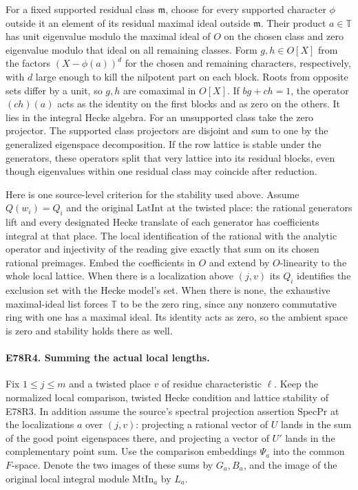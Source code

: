 For a fixed supported residual class $\mathfrak m$, choose for every
supported character $\phi$ outside it an element of its residual
maximal ideal outside $\mathfrak m$. Their product $a\in\mathbb T$
has unit eigenvalue modulo the maximal ideal of $O$ on the chosen
class and zero eigenvalue modulo that ideal on all remaining classes.
Form $g,h\in O[X]$ from the factors $(X-\phi(a))^d$ for the
chosen and remaining characters, respectively, with $d$ large enough
to kill the nilpotent part on each block. Roots from opposite sets
differ by a unit, so $g,h$ are comaximal in $O[X]$. If
$bg+ch=1$, the operator $(ch)(a)$ acts as the identity on the
first blocks and as zero on the others. It lies in the integral
Hecke algebra. For an unsupported class take the zero projector.
The supported class projectors are disjoint and sum to one by the
generalized eigenspace decomposition. If the row lattice is stable
under the generators, these operators split that very lattice into
its residual blocks, even though eigenvalues within one residual
class may coincide after reduction.

Here is one source-level criterion for the stability used above.
Assume $Q( w_i)=Q_i$ and the original $\mathrm{LatInt}$ at the
twisted place: the rational generators lift and every designated
Hecke translate of each generator has coefficients integral at that
place. The local identification of the rational with the analytic
operator and injectivity of the reading give exactly that sum on
its chosen rational preimages. Embed the coefficients in $O$ and
extend by $O$-linearity to the whole local lattice. When there is a
localization above $(j,v)$ its $Q_i$ identifies the exclusion set
with the Hecke model's set. When there is none, the exhaustive
maximal-ideal list forces $\mathbb T$ to be the zero ring, since any
nonzero commutative ring with one has a maximal ideal. Its identity
acts as zero, so the ambient space is zero and stability holds there
as well.

\paragraph{E78R4. Summing the actual local lengths.}
Fix $1\leq j\leq m$ and a twisted place $v$ of residue
characteristic $\ell$. Keep the normalized local comparison, twisted
Hecke condition and lattice stability of E78R3. In addition assume
the source's spectral projection assertion $\mathrm{SpecPr}$ at the
localizations $a$ over $(j,v)$: projecting a rational vector of
$U$ lands in the sum of the good point eigenspaces there, and
projecting a vector of $U'$ lands in the complementary point sum.
Use the comparison embeddings $\Psi_a$ into the common $F$-space.
Denote the two images of these sums by $G_a,B_a$, and the image of
the original local integral module $\mathrm{MtIn}_a$ by $L_a$.

